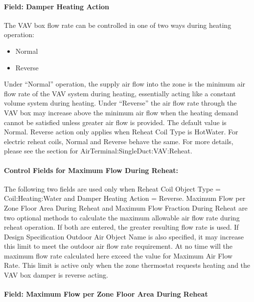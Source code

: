 \paragraph{Field: Damper Heating Action}\label{field-damper-heating-action-000}

The VAV box flow rate can be controlled in one of two ways during heating operation:

\begin{itemize}
\item
  Normal
\item
  Reverse
\end{itemize}

Under ``Normal'' operation, the supply air flow into the zone is the minimum air flow rate of the VAV system during heating, essentially acting like a constant volume system during heating. Under ``Reverse'' the air flow rate through the VAV box may increase above the minimum air flow when the heating demand cannot be satisfied unless greater air flow is provided. The default value is Normal. Reverse action only applies when Reheat Coil Type is HotWater. For electric reheat coils, Normal and Reverse behave the same. For more details, please see the section for AirTerminal:SingleDuct:VAV:Reheat.

\paragraph{Control Fields for Maximum Flow During Reheat:}\label{control-fields-for-maximum-flow-during-reheat-000}

The following two fields are used only when Reheat Coil Object Type = Coil:Heating:Water and Damper Heating Action = Reverse. Maximum Flow per Zone Floor Area During Reheat and Maximum Flow Fraction During Reheat are two optional methods to calculate the maximum allowable air flow rate during reheat operation. If both are entered, the greater resulting flow rate is used. If Design Specification Outdoor Air Object Name is also specified, it may increase this limit to meet the outdoor air flow rate requirement. At no time will the maximum flow rate calculated here exceed the value for Maximum Air Flow Rate. This limit is active only when the zone thermostat requests heating and the VAV box damper is reverse acting.

\paragraph{Field: Maximum Flow per Zone Floor Area During Reheat}\label{field-maximum-flow-per-zone-floor-area-during-reheat-000}


